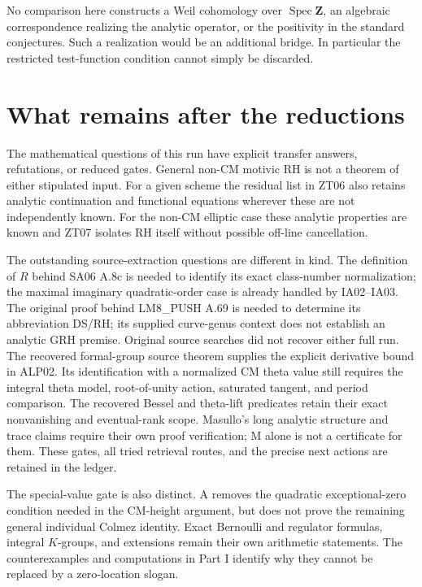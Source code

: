 \documentclass[11pt,a4paper]{article}
\theoremstyle{definition}
\begin{document}
No comparison here constructs a Weil cohomology over $\operatorname{Spec}
\mathbf Z$, an algebraic correspondence realizing the analytic operator,
or the positivity in the standard conjectures. Such a realization would
be an additional bridge. In particular the restricted test-function
condition cannot simply be discarded.




\section{What remains after the reductions}
The mathematical questions of this run have explicit transfer answers,
refutations, or reduced gates. General non-CM motivic RH is not a theorem
of either stipulated input. For a given scheme the residual list in ZT06
also retains analytic continuation and functional equations wherever these
are not independently known. For the non-CM elliptic case these analytic
properties are known and ZT07 isolates RH itself without possible
off-line cancellation.

The outstanding source-extraction questions are different in kind. The
definition of $R$ behind SA06 A.8c is needed to identify its exact
class-number normalization; the maximal imaginary quadratic-order case
is already handled by IA02--IA03. The original proof behind LM8\_PUSH
A.69 is needed to determine its abbreviation DS/RH; its supplied
curve-genus context does not establish an analytic GRH premise. Original
source searches did not recover either full run. The recovered formal-group source theorem supplies the explicit derivative bound in ALP02. Its identification with a normalized CM theta value still requires the integral theta model, root-of-unity action, saturated tangent, and period comparison. The recovered Bessel and theta-lift predicates retain their exact nonvanishing and eventual-rank scope. Masullo's long analytic
structure and trace claims require their own proof verification; M alone
is not a certificate for them. These gates, all tried retrieval routes,
and the precise next actions are retained in the ledger.

The special-value gate is also distinct. A removes the quadratic
exceptional-zero condition needed in the CM-height argument, but does not
prove the remaining general individual Colmez identity. Exact Bernoulli
and regulator formulas, integral $K$-groups, and extensions remain their
own arithmetic statements. The counterexamples and computations in
Part I identify why they cannot be replaced by a zero-location slogan.
\end{document}
